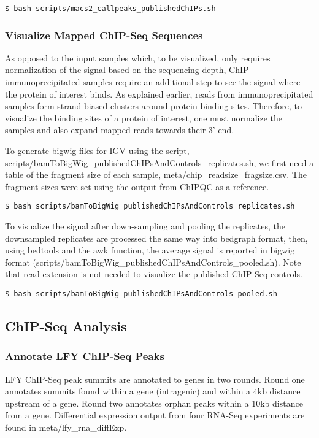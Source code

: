 \documentclass{article}
\begin{document}
\begin{sloppypar}
\begin{verbatim}
$ bash scripts/macs2_callpeaks_publishedChIPs.sh
\end{verbatim}


\subsubsection{Visualize Mapped ChIP-Seq Sequences}
As opposed to the input samples which, to be visualized, only requires normalization of the signal based on the sequencing depth, ChIP immunoprecipitated samples require an additional step to see the signal where the protein of interest binds. As explained earlier, reads from immunoprecipitated samples form strand-biased clusters around protein binding sites. Therefore, to visualize the binding sites of a protein of interest, one must normalize the samples and also expand mapped reads towards their 3' end.

To generate bigwig files for IGV using the script, {\selectfont scripts/bamToBigWig\_publishedChIPsAndControls\_replicates.sh}, we first need a table of the fragment size of each sample, {\selectfont meta/chip\_readsize\_fragsize.csv}. The fragment sizes were set using the output from ChIPQC as a reference.

\begin{verbatim}
$ bash scripts/bamToBigWig_publishedChIPsAndControls_replicates.sh
\end{verbatim}

To visualize the signal after down-sampling and pooling the replicates, the downsampled replicates are processed the same way into bedgraph format, then, using bedtools and the awk function, the average signal is reported in bigwig format ({\selectfont scripts/bamToBigWig\_publishedChIPsAndControls\_pooled.sh}). Note that read extension is not needed to visualize the published ChIP-Seq controls. 

\begin{verbatim}
$ bash scripts/bamToBigWig_publishedChIPsAndControls_pooled.sh
\end{verbatim}

\subsection{ChIP-Seq Analysis}
\subsubsection{Annotate LFY ChIP-Seq Peaks}
LFY ChIP-Seq peak summits are annotated to genes in two rounds. Round one annotates summits found within a gene (intragenic) and within a 4kb distance upstream of a gene. Round two annotates orphan peaks within a 10kb distance from a gene.  Differential expression output from four RNA-Seq experiments are found in {\selectfont meta/lfy\_rna\_diffExp}.


\end{sloppypar}
\end{document}
